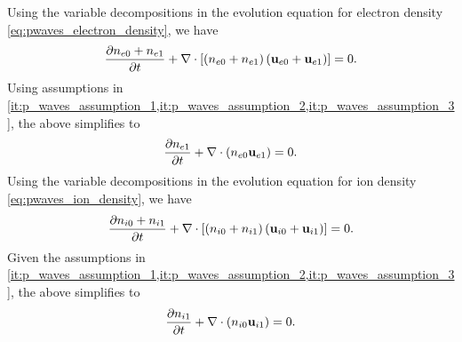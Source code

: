 \documentclass[a4paper,11pt]{report}
\begin{document}
Using the variable decompositions in the evolution equation for electron density \cref{eq:pwaves_electron_density}, we have
\begin{equation*}
    \frac{\partial n_{e0} + n_{e1}}{\partial t} + \nabla \cdot \left [ \left ( n_{e0} + n_{e1} \right )  \left ( \mathbf{u}_{e0} + \mathbf{u}_{e1} \right ) \right ] = 0.
\end{equation*}
Using assumptions in \cref{it:p_waves_assumption_1,it:p_waves_assumption_2,it:p_waves_assumption_3}, the above simplifies to
\begin{equation}
    \label{eq:p_waves_e_den_linearized}
    \frac{\partial n_{e1}}{\partial t} + \nabla \cdot \left (n_{e0} \mathbf{u}_{e1} \right ) = 0.
\end{equation}
Using the variable decompositions in the evolution equation for ion density \cref{eq:pwaves_ion_density}, we have
\begin{equation*}
    \frac{\partial n_{i0} + n_{i1}}{\partial t} + \nabla \cdot \left [ \left ( n_{i0} + n_{i1} \right )  \left ( \mathbf{u}_{i0} + \mathbf{u}_{i1} \right ) \right ] = 0.
\end{equation*}
Given the assumptions in \cref{it:p_waves_assumption_1,it:p_waves_assumption_2,it:p_waves_assumption_3}, the above simplifies to
\begin{equation}
    \label{eq:p_waves_i_den_linearized}
    \frac{\partial n_{i1}}{\partial t} + \nabla \cdot \left (n_{i0} \mathbf{u}_{i1} \right ) = 0.
\end{equation}
\end{document}
